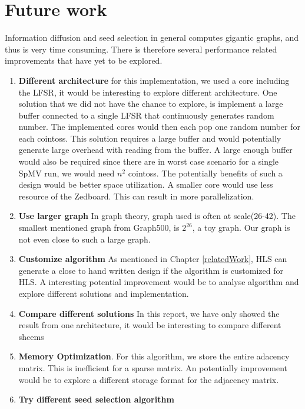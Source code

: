 \chapter{Future work} \label{futureWork}
Information diffusion and seed selection in general computes gigantic graphs, and thus is very time consuming. There is therefore several performance related improvements that have yet to be explored.

\begin{enumerate}
\item \textbf{Different architecture} for this implementation, we used a core including the LFSR, it would be interesting to explore different architecture. One solution that we did not have the chance to explore, is implement a large buffer connected to a single LFSR that continuously generates random number. The implemented cores would then each pop one random number for each cointoss. This solution requires a large buffer and would potentially generate large overhead with reading from the buffer. A large enough buffer  would also be required since there are in worst case scenario for a single SpMV run, we would need $n^2$ cointoss. The potentially benefits of such a design would be better space utilization. A smaller core would use less resource of the Zedboard. This can result in more parallelization.

\item \textbf{Use larger graph} In graph theory, graph used is often at scale(26-42). The smallest mentioned graph from Graph500, is $2^26$, a toy graph. Our graph is not even close to such a large graph.

\item \textbf{Customize algorithm} As mentioned in Chapter \ref{relatedWork}, HLS can generate a close to hand written design if the algorithm is customized for HLS. A interesting potential improvement would be to analyse algorithm and explore different solutions and implementation.

\item \textbf{Compare different solutions} In this report, we have only showed the result from one architecture, it would be interesting to compare different shcems

\item \textbf{Memory Optimization}. For this algorithm, we store the entire adacency matrix. This is inefficient for a sparse matrix. An potentially improvement would be to explore a different storage format for the adjacency matrix.

\item \textbf{Try different seed selection algorithm}
\end{enumerate}


